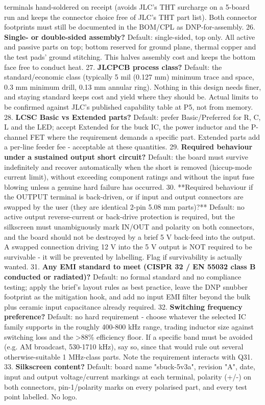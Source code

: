 \documentclass[11pt,a4paper]{article}
\begin{document}
terminals hand-soldered on receipt (avoids JLC's THT surcharge on a 5-board run and keeps the connector choice free of JLC's THT part list). Both connector footprints must still be documented in the BOM/CPL as DNP-for-assembly. 26. \textbf{Single- or double-sided assembly?} Default: single-sided, top only. All active and passive parts on top; bottom reserved for ground plane, thermal copper and the test pads' ground stitching. This halves assembly cost and keeps the bottom face free to conduct heat. 27. \textbf{JLCPCB process class?} Default: the standard/economic class (typically 5 mil (0.127 mm) minimum trace and space, 0.3 mm minimum drill, 0.13 mm annular ring). Nothing in this design needs finer, and staying standard keeps cost and yield where they should be. Actual limits to be confirmed against JLC's published capability table at P5, not from memory. 28. \textbf{LCSC Basic vs Extended parts?} Default: prefer Basic/Preferred for R, C, L and the LED; accept Extended for the buck IC, the power inductor and the P-channel FET where the requirement demands a specific part. Extended parts add a per-line feeder fee - acceptable at these quantities. 29. \textbf{Required behaviour under a sustained output short circuit?} Default: the board must survive indefinitely and recover automatically when the short is removed (hiccup-mode current limit), without exceeding component ratings and without the input fuse blowing unless a genuine hard failure has occurred. 30. {*}{*}Required behaviour if the OUTPUT terminal is back-driven, or if input and output connectors are swapped by the user (they are identical 2-pin 5.08 mm parts)?{*}{*} Default: no active output reverse-current or back-drive protection is required, but the silkscreen must unambiguously mark IN/OUT and polarity on both connectors, and the board should not be destroyed by a brief 5 V back-feed into the output. A swapped connection driving 12 V into the 5 V output is NOT required to be survivable - it will be prevented by labelling. Flag if survivability is actually wanted. 31. \textbf{Any EMI standard to meet (CISPR 32 / EN 55032 class B conducted or radiated)?} Default: no formal standard and no compliance testing; apply the brief's layout rules as best practice, leave the DNP snubber footprint as the mitigation hook, and add no input EMI filter beyond the bulk plus ceramic input capacitance already required. 32. \textbf{Switching frequency preference?} Default: no hard requirement - choose whatever the selected IC family supports in the roughly 400-800 kHz range, trading inductor size against switching loss and the \textgreater{}88\% efficiency floor. If a specific band must be avoided (e.g. AM broadcast, 530-1710 kHz), say so, since that would rule out several otherwise-suitable 1 MHz-class parts. Note the requirement interacts with Q31. 33. \textbf{Silkscreen content?} Default: board name "sbuck-5v3a", revision "A", date, input and output voltage/current markings at each terminal, polarity (+/-) on both connectors, pin-1/polarity marks on every polarised part, and every test point labelled. No logo.
\end{document}

